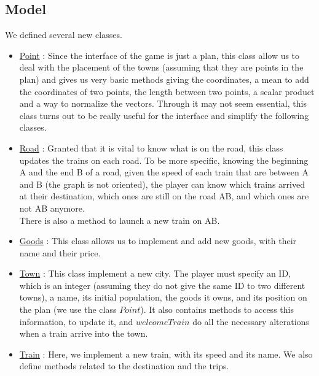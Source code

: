 \documentclass[a4paper]{article}
\begin{document}
	\subsection{Model}
	We defined several new classes.
	\begin{itemize}
		\item \underline{Point} : Since the interface of the game is just a plan, this class allow us to deal with the placement of the towns (assuming that they are points in the plan) and gives us very basic methods giving the coordinates, a mean to add the coordinates of two points, the length between two points, a scalar product and a way to normalize the vectors. Through it may not seem essential, this class turns out to be really useful for the interface and simplify the following classes.
		
		\item \underline{Road} : Granted that it is vital to know what is on the road, this class updates the trains on each road. To be more specific, knowing the beginning A and the end B of a road, given the speed of each train that are between A and B (the graph is not oriented), the player can know which trains arrived at their destination, which ones are still on the road AB, and which ones are not AB anymore.\\
		There is also a method to launch a new train on AB.
		
		\item \underline{Goods} : This class allows us to implement and add new goods, with their name and their price.
		
		\item \underline{Town} : This class implement a new city. The player must specify an ID, which is an integer (assuming they do not give the same ID to two different towns), a name, its initial population, the goods it owns, and its position on the plan (we use the class $Point$). It also contains methods to access this information, to update it, and $welcomeTrain$ do all the necessary alterations when a train arrive into the town.
		
		\item \underline{Train} : Here, we implement a new train, with its speed and its name. We also define methods related to the destination and the trips.
		

\end{itemize}
\end{document}
